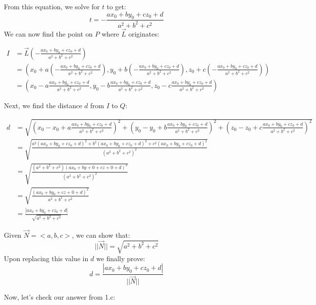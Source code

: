 \documentclass{article}
\begin{document}
\begin{text}
\indent From this equation, we solve for $t$ to get:
$$
t = -\frac{ax_0 + by_0 + cz_0 + d}{a^2 + b^2 + c^2}
$$
\indent\indent We can now find the point on $P$ where $\vec{L}$ originates:
\end{text}

\begin{align*}
I &= \vec{L}(-\frac{ax_0 + by_0 + cz_0 + d}{a^2 + b^2 + c^2}) \\
  &= (x_0+a(-\frac{ax_0 + by_0 + cz_0 + d}{a^2 + b^2 + c^2}), y_0+b(-\frac{ax_0 + by_0 + cz_0 + d}{a^2 + b^2 + c^2}), z_0+c(-\frac{ax_0 + by_0 + cz_0 + d}{a^2 + b^2 + c^2})) \\
  &= (x_0-a\frac{ax_0 + by_0 + cz_0 + d}{a^2 + b^2 + c^2}, y_0-b\frac{ax_0 + by_0 + cz_0 + d}{a^2 + b^2 + c^2}, z_0-c\frac{ax_0 + by_0 + cz_0 + d}{a^2 + b^2 + c^2})
\end{align*}

\begin{text}
\indent Next, we find the distance $d$ from $I$ to $Q$: 
\end{text}

\begin{align*}
d &= \sqrt{(x_0 - x_0 + a\frac{ax_0 + by_0 + cz_0 + d}{a^2 + b^2 + c^2})^2 + (y_0 - y_0 + b\frac{ax_0 + by_0 + cz_0 + d}{a^2 + b^2 + c^2})^2 + (z_0 - z_0 + c\frac{ax_0 + by_0 + cz_0 + d}{a^2 + b^2 + c^2})^2} \\
&= \sqrt{\frac{a^2(ax_0+by_0+cz_0+d)^2 + b^2(ax_0+by_0+cz_0+d)^2 + c^2(ax_0+by_0+cz_0+d)^2}{(a^2 + b^2 + c^2)^2}} \\
&= \sqrt{\frac{(a^2 + b^2 + c^2)(ax_0+by+0+cz+0+d)^2}{(a^2 + b^2 + c^2)^2}} \\
&= \sqrt{\frac{(ax_0 + by_0 + cz+0 +d)^2}{a^2 + b^2 + c^2}} \\
&= \frac{|ax_0 + by_0 + cz_0 + d|}{\sqrt{a^2+b^2+c^2}}
\end{align*}

\begin{text}
\indent Given $\vec{N}=<a,b,c>$, we can show that: \\
$$
||\vec{N}|| = \sqrt{a^2+b^2+c^2}
$$
\indent\indent Upon replacing this value in $d$ we finally prove: \\
$$
d = \frac{|ax_0 + by_0 + cz_0 + d|}{||\vec{N}||}
$$
\end{text}

\newpage

\begin{text}
\indent Now, let's check our answer from 1.c:
\end{text}
\end{document}
